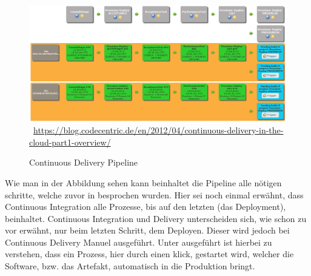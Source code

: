 \begin{figure}[htb]
    \centering 
    \includegraphics[width=\linewidth]{content/images/pipeline}\
    \quelle\url{https://blog.codecentric.de/en/2012/04/continuous-delivery-in-the-cloud-part1-overview/}
    \caption[Continuous Delivery Pipeline]{Continuous Delivery Pipeline\\}
    \label{fig:ContinuousDeliveryPipeline}  
\end{figure}\noindent 
Wie man in der Abbildung sehen kann beinhaltet die Pipeline alle nötigen schritte, welche zuvor in  besprochen wurden. Hier sei noch einmal erwähnt, dass Continuous Integration alle Prozesse, bis auf den letzten (das Deployment), beinhaltet. Continuous Integration und Delivery unterscheiden sich, wie schon zu vor erwähnt, nur beim letzten Schritt, dem Deployen. Dieser wird jedoch bei Continuous Delivery Manuel ausgeführt. Unter ausgeführt ist hierbei zu verstehen, dass ein Prozess, hier durch einen klick, gestartet wird, welcher die Software, bzw. das Artefakt, automatisch in die Produktion bringt.

